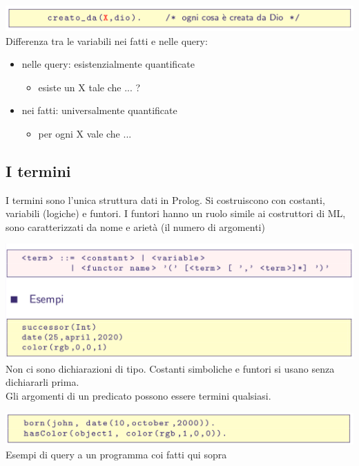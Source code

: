 \documentclass[10pt]{article}
\begin{document}
\includegraphics[scale=0.2]{Immagini/prolog5.png}
\\
Differenza tra le variabili nei fatti e nelle query:
\begin{itemize}
    \item nelle query: esistenzialmente quantificate
    \begin{itemize}
        \item esiste un X tale che ... ?
    \end{itemize}
    \item nei fatti: universalmente quantificate
    \begin{itemize}
        \item per ogni X vale che ...
    \end{itemize}
\end{itemize}
\subsection{I termini}
I termini sono l’unica struttura dati in Prolog. 
Si costruiscono con costanti, variabili (logiche) e funtori.
I funtori hanno un ruolo simile ai costruttori di ML, sono
caratterizzati da nome e arietà (il numero di argomenti)

\includegraphics[scale=0.2]{Immagini/prolog6.png}
\\
Non ci sono dichiarazioni di tipo.
Costanti simboliche e funtori si usano senza dichiararli prima.
\\
Gli argomenti di un predicato possono essere termini qualsiasi.

\includegraphics[scale=0.2]{Immagini/prolog7.png}
\\
Esempi di query a un programma coi fatti qui sopra
\end{document}
